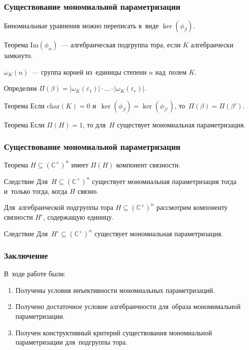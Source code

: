 \documentclass{beamer}
\begin{document}
\begin{frame}
  \frametitle{Существование мономиальной параметризации}

  Биномиальные уравнения можно переписать в~виде $\ker(\phi_\beta)$.

  \begin{block}{Теорема}
    $\mathrm{Im}(\phi_\alpha)$~— алгебраическая подгруппа тора, если $K$ алгебраически замкнуто.
  \end{block}

  $\omega_K(n)$~— группа корней из~единицы степени $n$ над~полем $K$.

  Определим $\Pi(\beta) = |\omega_K(\varepsilon_1)| \cdot \ldots \cdot |\omega_K(\varepsilon_r)|$.

  \begin{block}{Теорема}
    Если $\mathrm{char}(K) = 0$ и~$\ker(\phi_{\beta}) = \ker(\phi_{\beta'})$, то~$\Pi(\beta) = \Pi(\beta')$.
  \end{block}

  \begin{block}{Теорема}
    Если $\Pi(H) = 1$, то для~$H$ существует мономиальная параметризация.
  \end{block}
\end{frame}

\begin{frame}
  \frametitle{Существование мономиальной параметризации}

  \begin{block}{Теорема}
    $H \subseteq (\mathbb{C}^\times)^n$ имеет $\Pi(H)$ компонент связности.
  \end{block}

  \begin{block}{Следствие}
    Для~$H \subseteq (\mathbb{C}^\times)^n$ существует мономиальная параметризация
    тогда и~только тогда, когда $H$ связно.
  \end{block}

  Для~алгебраической подгруппы тора $H \subseteq (\mathbb{C}^\times)^n$ рассмотрим компоненту
  связности $H^\circ$, содержащую единицу.

  \begin{block}{Следствие}
    Для~$H^\circ \subseteq (\mathbb{C}^\times)^n$ существует мономиальная параметризация.
  \end{block}
\end{frame}

\begin{frame}
  \frametitle{Заключение}

  В~ходе работе были:

  \begin{enumerate}
    \item Получены условия инъективности мономиальных параметризаций.
    \item Получено достаточное условие алгебраичности для~образа мономимальной параметризации.
    \item Получен конструктивный критерий существования мономиальной параметризации для~подгруппы тора.
  \end{enumerate}
\end{frame}
\end{document}
